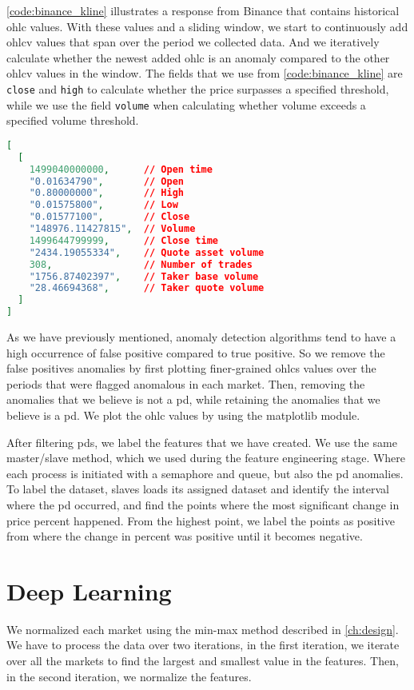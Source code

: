 \autoref{code:binance_kline} illustrates a response from Binance that contains historical \ac{ohlc} values. With these values and a sliding window, we start to continuously add \ac{ohlcv} values that span over the period we collected data. And we iteratively calculate whether the newest added \ac{ohlc} is an anomaly compared to the other \ac{ohlcv} values in the window. The fields that we use from \autoref{code:binance_kline} are \texttt{close} and \texttt{high} to calculate whether the price surpasses a specified threshold, while we use the field \texttt{volume} when calculating whether volume exceeds a specified volume threshold.

\begin{lstlisting}[language=json, caption={Historical kline response from Binance.}, label=code:binance_kline]
[
  [
    1499040000000,      // Open time
    "0.01634790",       // Open
    "0.80000000",       // High
    "0.01575800",       // Low
    "0.01577100",       // Close
    "148976.11427815",  // Volume
    1499644799999,      // Close time
    "2434.19055334",    // Quote asset volume
    308,                // Number of trades
    "1756.87402397",    // Taker base volume
    "28.46694368",      // Taker quote volume
  ]
]
\end{lstlisting}

As we have previously mentioned, anomaly detection algorithms tend to have a high occurrence of false positive compared to true positive. So we remove the false positives anomalies by first plotting finer-grained \acp{ohlc} values over the periods that were flagged anomalous in each market. Then, removing the anomalies that we believe is not a \ac{pd}, while retaining the anomalies that we believe is a \ac{pd}. We plot the \ac{ohlc} values by using the matplotlib module.

After filtering \acp{pd}, we label the features that we have created. We use the same master/slave method, which we used during the feature engineering stage. Where each process is initiated with a semaphore and queue, but also the \ac{pd} anomalies. To label the dataset, slaves loads its assigned dataset and identify the interval where the \ac{pd} occurred, and find the points where the most significant change in price percent happened. From the highest point, we label the points as positive from where the change in percent was positive until it becomes negative.

\section{Deep Learning}
We normalized each market using the min-max method described in \autoref{ch:design}. We have to process the data over two iterations, in the first iteration, we iterate over all the markets to find the largest and smallest value in the features. Then, in the second iteration, we normalize the features.

